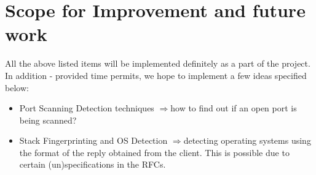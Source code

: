 \documentclass{article}
\newcommand{\ar}{\(\Rightarrow\)}
\begin{document}
\section{Scope for Improvement and future work}
\begin{flushleft}
All the above listed items will be implemented definitely as a part of the project. In addition - provided time permits, we hope to implement a few ideas specified below:
\begin{itemize}
\item Port Scanning Detection techniques \ar how to find out if an open port is being scanned?
\item Stack Fingerprinting and OS Detection \ar detecting operating systems using the format of the reply obtained from the client. This is possible due to certain (un)specifications in the RFCs.
\end{itemize}
\end{flushleft}


\end{document}
